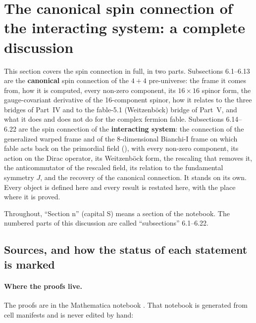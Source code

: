 \begingroup
\setlength{\emergencystretch}{4em}
\section{The canonical spin connection of the interacting system: a complete discussion}
\label{csc:top}\label{sec:6}

This section covers the spin connection in full, in two parts. Subsections 6.1--6.13 are the
\textbf{canonical} spin connection of the $4+4$ pre-universe: the frame it comes from, how it is
computed, every non-zero component, its $16\times16$ spinor form, the gauge-covariant derivative of the
16-component spinor, how it relates to the three bridges of Part~IV and to the fable-5.1
(Weitzenb\"ock) bridge of Part~V, and what it does and does not do for the complex fermion fable.
Subsections 6.14--6.22 are the spin connection of the \textbf{interacting system}: the connection of
the generalized warped frame and of the 8-dimensional Bianchi-I frame on which fable acts back on the
primordial field (), with every non-zero component, its action on the Dirac operator,
its Weitzenb\"ock form, the rescaling that removes it, the anticommutator of the rescaled field, its
relation to the fundamental symmetry $J$, and the recovery of the canonical connection. It stands on
its own. Every object is defined here and every result is restated here, with the place where it is
proved.

Throughout, ``Section n'' (capital S) means a section of the notebook. The numbered parts of this
discussion are called ``subsections'' 6.1--6.22.

\subsection{Sources, and how the status of each statement is marked}
\label{csc:sources}\label{sec:6.1}

\paragraph{Where the proofs live.} The proofs are in the Mathematica notebook
. That notebook is generated from cell
manifests and is never edited by hand:


